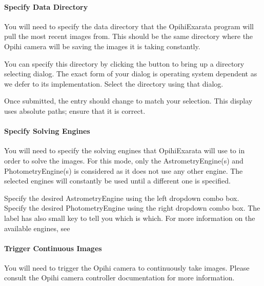 \documentclass[letterpaper,11pt,english]{sphinxmanual}
\begin{document}
\paragraph{Specify Data Directory}
\label{\detokenize{user/automatic_mode:specify-data-directory}}
\sphinxAtStartPar
You will need to specify the data directory that the OpihiExarata program will
pull the most recent images from. This should be the same directory where the
Opihi camera will be saving the images it is taking constantly.

\sphinxAtStartPar
You can specify this directory by clicking the  button to
bring up a directory selecting dialog. The exact form of your dialog is
operating system dependent as we defer to its implementation. Select the
directory using that dialog.

\sphinxAtStartPar
Once submitted, the  entry should change to match
your selection. This display uses absolute paths; ensure that it is correct.


\paragraph{Specify Solving Engines}
\label{\detokenize{user/automatic_mode:specify-solving-engines}}
\sphinxAtStartPar
You will need to specify the solving engines that OpihiExarata will use to in
order to solve the images. For this mode, only the AstrometryEngine(s) and
PhotometryEngine(s) is considered as it does not use any other engine. The
selected engines will constantly be used until a different one is specified.

\sphinxAtStartPar
Specify the desired AstrometryEngine using the left drop\sphinxhyphen{}down combo box.
Specify the desired PhotometryEngine using the right drop\sphinxhyphen{}down combo box.
The  label has also small key to tell you which is
which. For more information on the available engines, see
{\hyperref[\detokenize{technical/architecture/services_engines:technical-architecture-services-engines}]{}}


\paragraph{Trigger Continuous Images}
\label{\detokenize{user/automatic_mode:trigger-continuous-images}}
\sphinxAtStartPar
You will need to trigger the Opihi camera to continuously take images.
Please consult the Opihi camera controller documentation for more information.
\end{document}
